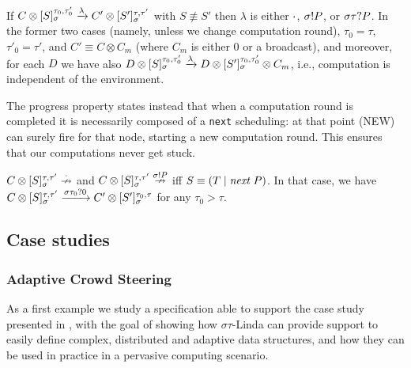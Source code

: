 \documentclass[12pt,a4paper,twoside,openright]{book}
\begin{document}
\begin{property}
If $C\otimes[ S ]_{\sigma}^{\tau_0,\tau'_0}\xrightarrow{\lambda}C'\otimes [ S' ]_{\sigma}^{\tau,\tau'}$ with $S\not\equiv S'$ then $\lambda$ is either $\cdot$, $\sigma!P$, or $\sigma\tau?P$.
%
In the former two cases (namely, unless we change computation round), $\tau_0=\tau$, $\tau'_0=\tau'$, and $C'\equiv C\otimes C_m$ (where $C_m$ is either $0$ or a broadcast), and moreover, for each $D$ we have also 
\mbox{$D\otimes[ S ]_{\sigma}^{\tau_0,\tau'_0}\xrightarrow{\lambda}D\otimes [ S' ]_{\sigma}^{\tau_0,\tau'_0}\otimes C_m$}, i.e., computation is independent of the environment.
\end{property}
\noindent The progress property states instead that when a computation round is completed it is necessarily composed of a \texttt{next} scheduling: at that point (NEW) can surely fire for that node, starting a new computation round. This ensures that our computations never get stuck.

\begin{property}
$C\otimes[ S ]_{\sigma}^{\tau,\tau'}\stackrel{\cdot}{\nrightarrow}$ and $C\otimes[ S ]_{\sigma}^{\tau,\tau'}\stackrel{\sigma!P}{\nrightarrow}$ iff $S\equiv(T\;|\;\textit{next}~P)$. In that case, we have $C\otimes[ S ]_{\sigma}^{\tau,\tau'}\xrightarrow{\sigma\tau_0?0}C'\otimes[ S' ]_{\sigma}^{\tau_0,\tau}$ for any $\tau_0>\tau$.
\end{property}

\subsection{Case studies}

\subsubsection{Adaptive Crowd Steering}

As a first example we study a specification able to support the case study presented in \cite{sapereecolaws-sac2012,mass2011}, with the goal of showing how $\sigma\tau$-Linda can provide support to easily define complex, distributed and adaptive data structures, and how they can be used in practice in a pervasive computing scenario.
\end{document}
